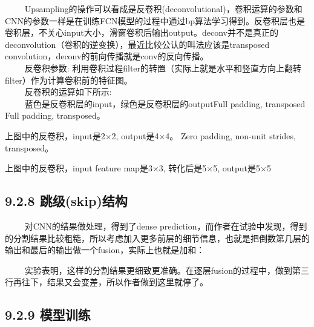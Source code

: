   
Upsampling的操作可以看成是反卷积(deconvolutional)，卷积运算的参数和CNN的参数一样是在训练FCN模型的过程中通过bp算法学习得到。反卷积层也是卷积层，不关心input大小，滑窗卷积后输出output。deconv并不是真正的deconvolution（卷积的逆变换），最近比较公认的叫法应该是transposed
convolution，deconv的前向传播就是conv的反向传播。\\
   反卷积参数:
利用卷积过程filter的转置（实际上就是水平和竖直方向上翻转filter）作为计算卷积前的特征图。\\
   反卷积的运算如下所示:\\
   蓝色是反卷积层的input，绿色是反卷积层的outputFull padding, transposed
Full padding, transposed。

\begin{figure}
\centering
\end{figure}

上图中的反卷积，input是2×2, output是4×4。 Zero padding, non-unit
strides, transposed。


上图中的反卷积，input feature map是3×3, 转化后是5×5, output是5×5

\subsection{9.2.8 跳级(skip)结构}\label{ux8df3ux7ea7skipux7ed3ux6784}

   对CNN的结果做处理，得到了dense
prediction，而作者在试验中发现，得到的分割结果比较粗糙，所以考虑加入更多前层的细节信息，也就是把倒数第几层的输出和最后的输出做一个fusion，实际上也就是加和：

  
实验表明，这样的分割结果更细致更准确。在逐层fusion的过程中，做到第三行再往下，结果又会变差，所以作者做到这里就停了。

\subsection{9.2.9 模型训练}\label{ux6a21ux578bux8badux7ec3}

